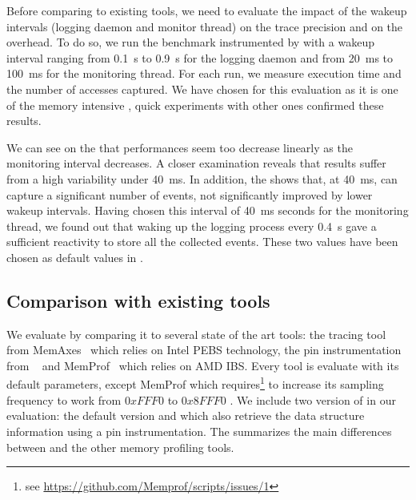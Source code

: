 Before comparing \Moca to existing tools, we need to evaluate the impact of
the wakeup intervals (logging daemon and monitor thread) on the trace
precision and on the overhead. To do so, we run the \IS benchmark instrumented by \Moca with
a wakeup interval ranging from \SI{0.1}{s} to  \SI{0.9}{s} for the logging daemon and from \SI{20}{ms} to
\SI{100}{ms} for the monitoring thread. For each run, we measure \IS execution time and the number of
accesses captured. We have chosen \IS for this evaluation as it is one of the memory intensive \NPB,
quick experiments with other ones confirmed these results.


We can see on the  that performances seem too decrease linearly
as the monitoring interval decreases. A closer examination reveals that results
suffer from a high variability under \SI{40}{ms}. 
In addition, the  shows
that, at \SI{40}{ms}, \Moca can capture a significant number of events, not significantly improved
by lower wakeup intervals. Having chosen this interval of \SI{40}{ms} seconds for the monitoring thread,
we found out that waking up the logging process every \SI{0.4}{s} gave a sufficient reactivity to store
all the collected events.
These two values have been chosen as default values in \Moca.

\subsection{Comparison with existing tools}
\label{sec:expe-ovh}

We evaluate \Moca by comparing it to several state of the art tools: \Mitos
the tracing tool from MemAxes~\cite{Gimenez14Dissecting} which relies on Intel
PEBS technology, the pin instrumentation from
\TABARNAC~\cite{Beniamine15TABARNAC} and MemProf~\cite{Lachaize12MemProf}
which relies on AMD IBS. Every tool is evaluate with its default parameters,
except MemProf which requires\footnote{see
    \url{https://github.com/Memprof/scripts/issues/1}} to increase its
    sampling frequency to work from $0xFFF0$ to $0x8FFF0$ .
We include two version of \Moca in our evaluation: the default version and
\MocaPin which also retrieve the data structure information using a pin
instrumentation.
The  summarizes the main differences between \Moca and the
other memory profiling tools.

